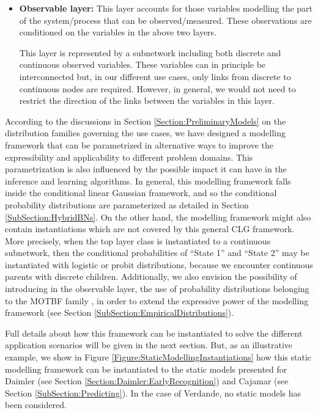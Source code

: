 \begin{itemize}
\item \textbf{Observable layer:} This layer accounts for those variables modelling the part of the system/process that can be observed/measured. These observations are conditioned on the variables in the above two layers. 

This layer is represented by a subnetwork including both discrete and continuous observed variables. These variables can in principle be interconnected but, in our different use cases, only links from discrete to continuous nodes are required. However, in general, we would not need to restrict the direction of the links between the variables in this layer.

\end{itemize} 


According to the discussions in Section \ref{Section:PreliminaryModels} on the distribution families governing the use
cases, we have designed a modelling framework that can be parametrized in alternative ways to improve the expressibility
and applicability to different problem domains. This parametrization is also influenced by the possible impact it can
have in the inference and learning algorithms. In general, this modelling framework falls inside the conditional linear
Gaussian framework, and so the conditional probability distributions are parameterized as detailed in Section
\ref{SubSection:HybridBNs}. On the other hand, the modelling framework might also contain instantiations which are not
covered by this general CLG framework. More precisely, when the top layer class is instantiated to  a continuous
subnetwork, then the conditional probabilities of ``State 1'' and ``State 2'' may be instantiated with logistic or
probit distributions, because we encounter continuous parents with discrete children. Additionally, we also envision the
possibility of introducing in the observable layer, the use of probability distributions belonging to the MOTBF family
\cite{Langseth12}, in order to extend the expressive power of the modelling framework (see Section \ref{SubSection:EmpiricalDistributions}).

Full details about how this framework can be instantiated to solve the different application scenarios will be given in the next section. But, as an illustrative example, we show in Figure \ref{Figure:StaticModellingInstantiations} how this static modelling framework can be instantiated to the static models presented for Daimler (see Section \ref{Section:Daimler:EarlyRecognition}) and Cajamar (see Section \ref{SubSection:Predicting}). In the case of Verdande, no static models has been considered. 


